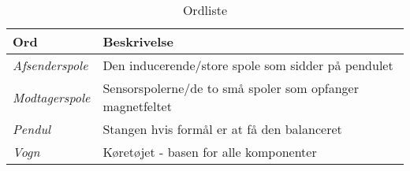 \begin{table}[h!]
	\centering
	\caption{Ordliste}
	\label{tab:ordliste}
	\begin{threeparttable}
		\begin{tabular}{l l}
			\toprule
			\multicolumn{1}{l}{Ord}       &
			\multicolumn{1}{l}{Beskrivelse}  \\ 
			\midrule
			\textit{Afsenderspole}	& Den inducerende/store spole som sidder på pendulet\\
			\textit{Modtagerspole}	& Sensorspolerne/de to små spoler som opfanger magnetfeltet\\
			\textit{Pendul}			& Stangen hvis formål er at få den balanceret\\
			\textit{Vogn}			& Køretøjet - basen for alle komponenter\\
			
			\bottomrule
		\end{tabular}
	\end{threeparttable}
\end{table}

